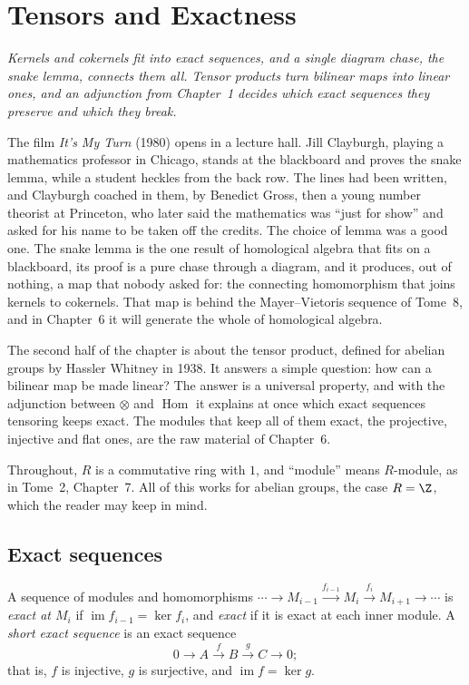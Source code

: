 \chapter{Tensors and Exactness}

\begin{center}\itshape
Kernels and cokernels fit into exact sequences, and a single diagram chase, the snake lemma, connects them all. Tensor products turn bilinear maps into linear ones, and an
adjunction from Chapter~1 decides which exact sequences they preserve and which they break.
\end{center}

The film \emph{It's My Turn} (1980) opens in a lecture hall. Jill Clayburgh, playing a mathematics professor in Chicago, stands at the blackboard and proves the snake lemma, while a
student heckles from the back row. The lines had been written, and Clayburgh coached in them, by Benedict Gross, then a young number theorist at Princeton, who later said the
mathematics was ``just for show'' and asked for his name to be taken off the credits. The choice of lemma was a good one. The snake lemma is the one result of homological algebra
that fits on a blackboard, its proof is a pure chase through a diagram, and it produces, out of nothing, a map that nobody asked for: the connecting homomorphism that joins
kernels to cokernels. That map is behind the Mayer--Vietoris sequence of Tome~8, and in Chapter~6 it will generate the whole of homological algebra.

The second half of the chapter is about the tensor product, defined for abelian groups by Hassler Whitney in 1938. It answers a simple question: how can a bilinear map be made
linear? The answer is a universal property, and with the adjunction between $\otimes$ and $\operatorname{Hom}$ it explains at once which exact sequences tensoring keeps exact. The
modules that keep all of them exact, the projective, injective and flat ones, are the raw material of Chapter~6.

Throughout, $R$ is a commutative ring with $1$, and ``module'' means $R$-module, as in Tome~2, Chapter~7. All of this works for abelian groups, the case $R=\Z$, which the reader may keep in mind.

\section{Exact sequences}

\begin{definition}\label{def:exact}
A sequence of modules and homomorphisms $\cdots\to M_{i-1}\xrightarrow{f_{i-1}}M_i\xrightarrow{f_i}M_{i+1}\to\cdots$ is \emph{exact at $M_i$} if $\operatorname{im}f_{i-1}=\ker f_i$, and \emph{exact} if it is exact
at each inner module. A \emph{short exact sequence} is an exact sequence
\[0\to A\xrightarrow{f}B\xrightarrow{g}C\to0;\]
that is, $f$ is injective, $g$ is surjective, and $\operatorname{im}f=\ker g$.
\end{definition}


